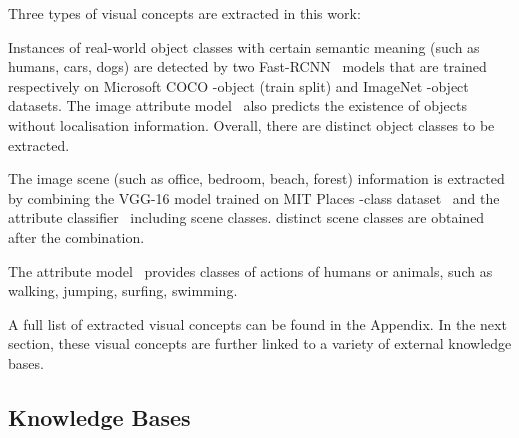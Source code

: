 \documentclass[10pt,journal]{IEEEtran}
\begin{document}
Three types of visual concepts are extracted in this work:

Instances of real-world object classes with certain semantic meaning (such as humans, cars, dogs)
are detected by two Fast-RCNN~\cite{girshick2015fast} models that are trained respectively on 
Microsoft COCO -object (train split) and ImageNet -object datasets.
The image attribute model~\cite{qi2015caption} also predicts the existence 
of  objects without localisation information.
Overall, there are  distinct object classes to be extracted.

The image scene (such as office, bedroom, beach, forest) 
information is extracted by combining 
the VGG-16 model trained on MIT Places -class dataset~\cite{zhou2014learning} and
the attribute classifier~\cite{qi2015caption} including  scene classes. 
 distinct scene classes are obtained after the combination.


The attribute model~\cite{qi2015caption} provides  classes of actions of humans or animals,
such as walking, jumping, surfing, swimming. 

A full list of extracted visual concepts can be found in the Appendix.
In the next section, these visual concepts are further linked to a variety of external knowledge bases.


\subsection{Knowledge Bases}
\end{document}
